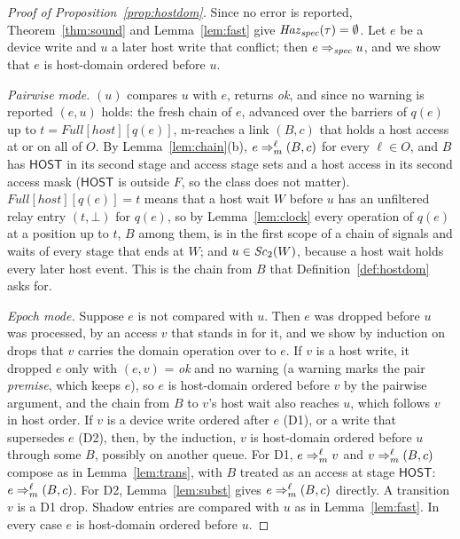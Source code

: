 \begin{proof}[Proof of Proposition~\ref{prop:hostdom}]
Since no error is reported, Theorem~\ref{thm:sound} and Lemma~\ref{lem:fast} give $\mathit{Haz}_{\mathit{spec}}(\tau) = \emptyset$. Let $e$ be a
device write and $u$ a later host write that conflict; then $e \Rightarrow_{\mathit{spec}} u$, and we show that $e$ is host-domain ordered
before $u$.

\emph{Pairwise mode.} $(u)$ compares $u$ with $e$,  returns \emph{ok}, and since no warning is
reported $(e,u)$ holds: the fresh chain of $e$, advanced over the barriers of $q(e)$ up to $t =
\mathit{Full}[\mathit{host}][q(e)]$, m-reaches a link $(B,c)$ that holds a host access at  or
 on all of $O$. By Lemma~\ref{lem:chain}(b), $e \Rightarrow_{m}^{\ell} (B,c)$ for every $\ell \in O$, and $B$
has $\mathsf{HOST}$ in its second stage and access stage sets and a host access in its second access mask ($\mathsf{HOST}$
is outside $F$, so the class does not matter). $\mathit{Full}[\mathit{host}][q(e)] = t$ means that a host wait $W$
before $u$ has an unfiltered relay entry $(t,\bot)$ for $q(e)$, so by Lemma~\ref{lem:clock} every operation of $q(e)$
at a position up to $t$, $B$ among them, is in the first scope of a chain of signals and waits of every stage that ends
at $W$; and $u \in \mathit{Sc}_{2}(W)$, because a host wait holds every later host event. This is the chain from $B$ that
Definition~\ref{def:hostdom} asks for.

\emph{Epoch mode.} Suppose $e$ is not compared with $u$. Then $e$ was dropped before $u$ was processed, by an access $v$
that stands in for it, and we show by induction on drops that $v$ carries the domain operation over to $e$. If $v$ is
a host write, it dropped $e$ only with $(e,v)$ = \emph{ok} and no warning (a warning marks the pair
\emph{premise}, which keeps $e$), so $e$ is host-domain ordered before $v$ by the pairwise argument, and the chain
from $B$ to $v$'s host wait also reaches $u$, which follows $v$ in host order. If $v$ is a device write ordered after
$e$ (D1), or a write that supersedes $e$ (D2), then, by the induction, $v$ is host-domain ordered before $u$ through
some $B$, possibly on another queue. For D1, $e \Rightarrow_{m}^{\ell} v$ and $v \Rightarrow_{m}^{\ell} (B,c)$ compose as in
Lemma~\ref{lem:trans}, with $B$ treated as an access at stage $\mathsf{HOST}$: $e \Rightarrow_{m}^{\ell} (B,c)$. For D2,
Lemma~\ref{lem:subst} gives $e \Rightarrow_{m}^{\ell} (B,c)$ directly. A transition $v$ is a D1 drop. Shadow entries are
compared with $u$ as in Lemma~\ref{lem:fast}. In every case $e$ is host-domain ordered before $u$.
\end{proof}

